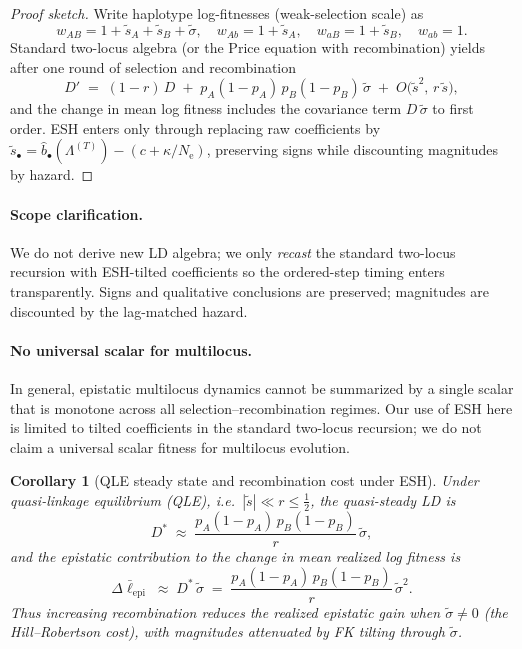 \documentclass[11pt]{article}
\theoremstyle{upright}
\newtheorem{corollary}{Corollary}
\newcommand{\Ne}{N_{\mathrm{e}}}
\newcommand{\hazT}[1]{\Lambda^{(#1)}}          %
\begin{document}
\begin{proof}[Proof sketch]
Write haplotype log-fitnesses (weak-selection scale) as
\[
w_{AB}=1+\tilde s_A+\tilde s_B+\tilde\sigma,\quad
w_{Ab}=1+\tilde s_A,\quad
w_{aB}=1+\tilde s_B,\quad
w_{ab}=1.
\]
Standard two-locus algebra (or the Price equation with recombination) yields after one round of selection and recombination
\[
D' \;=\; (1-r)\,D \;+\; p_A(1-p_A)\,p_B(1-p_B)\,\tilde\sigma \;+\; O\!\big(\tilde s^2,\, r\,\tilde s\big),
\]
and the change in mean log fitness includes the covariance term $D\,\tilde\sigma$ to first order.
ESH enters only through replacing raw coefficients by $\tilde s_\bullet=\widehat b_\bullet(\hazT{T})-(c+\kappa/\Ne)$, preserving signs while discounting magnitudes by hazard.
\end{proof}

\paragraph{Scope clarification.}
We do not derive new LD algebra; we only \emph{recast} the standard two-locus recursion with ESH-tilted coefficients so the ordered-step timing enters transparently. Signs and qualitative conclusions are preserved; magnitudes are discounted by the lag-matched hazard.

\paragraph{No universal scalar for multilocus.}
In general, epistatic multilocus dynamics cannot be summarized by a single scalar that is
monotone across all selection–recombination regimes. Our use of ESH here is limited to
tilted coefficients in the standard two-locus recursion; we do not claim a universal scalar
fitness for multilocus evolution.

\begin{corollary}[QLE steady state and recombination cost under ESH]\label{cor:QLE}
Under quasi-linkage equilibrium (QLE), i.e.\ $|\tilde s|\ll r\le \tfrac12$, the quasi-steady LD is
\[
D^{\ast} \;\approx\; \frac{p_A(1-p_A)\,p_B(1-p_B)}{r}\,\tilde\sigma,
\]
and the epistatic contribution to the change in mean realized log fitness is
\[
\Delta \bar\ell_{\mathrm{epi}} \;\approx\; D^{\ast}\,\tilde\sigma \;=\; \frac{p_A(1-p_A)\,p_B(1-p_B)}{r}\,\tilde\sigma^2.
\]
Thus increasing recombination reduces the realized epistatic gain when $\tilde\sigma\neq 0$ (the Hill--Robertson cost), with magnitudes attenuated by FK tilting through $\tilde\sigma$.
\end{corollary}
\end{document}
